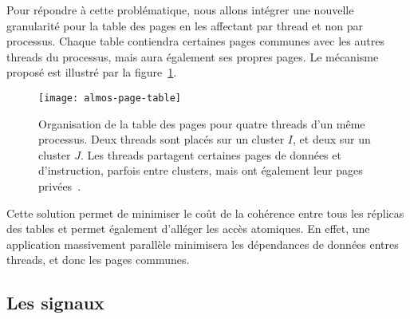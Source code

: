       Pour répondre à cette problématique, nous allons intégrer une nouvelle
      granularité pour la table des pages en les affectant par thread et non par
      processus. Chaque table contiendra certaines pages communes avec les
      autres threads du processus, mais aura également ses propres pages. Le
      mécanisme proposé est illustré par la figure~\ref{fig:almos-page-table}.

      \begin{figure}[ht]
        \centering
        \texttt{[image: almos-page-table]}
        \caption{Organisation de la table des pages pour quatre threads d'un
          même processus. Deux threads sont placés sur un cluster $I$, et deux
          sur un cluster $J$. Les threads partagent certaines pages de données
          et d'instruction, parfois entre clusters, mais ont également leur
          pages privées~\citep{almaless2014universite}.}
        \label{fig:almos-page-table}
      \end{figure}

      Cette solution permet de minimiser le coût de la cohérence entre tous les
      réplicas des tables et permet également d'alléger les accès atomiques. En
      effet, une application massivement parallèle minimisera les dépendances de
      données entres threads, et donc les pages communes.


    \subsection{Les signaux}



